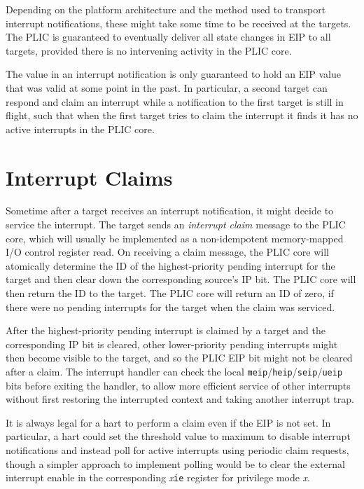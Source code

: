 Depending on the platform architecture and the method used to
transport interrupt notifications, these might take some time to be
received at the targets.  The PLIC is guaranteed to eventually deliver
all state changes in EIP to all targets, provided there is no
intervening activity in the PLIC core.

\begin{commentary}
The value in an interrupt notification is only guaranteed to hold an
EIP value that was valid at some point in the past.  In particular, a
second target can respond and claim an interrupt while a notification
to the first target is still in flight, such that when the first
target tries to claim the interrupt it finds it has no active
interrupts in the PLIC core.
\end{commentary}

\section{Interrupt Claims}

Sometime after a target receives an interrupt notification, it might
decide to service the interrupt.  The target sends an {\em interrupt
  claim} message to the PLIC core, which will usually be implemented
as a non-idempotent memory-mapped I/O control register read.  On
receiving a claim message, the PLIC core will atomically determine the
ID of the highest-priority pending interrupt for the target and then
clear down the corresponding source's IP bit.  The PLIC core will then
return the ID to the target.  The PLIC core will return an ID of zero,
if there were no pending interrupts for the target when the claim was
serviced.

After the highest-priority pending interrupt is claimed by a target
and the corresponding IP bit is cleared, other lower-priority pending
interrupts might then become visible to the target, and so the PLIC
EIP bit might not be cleared after a claim.  The interrupt handler
can check the local {\tt meip}/{\tt heip}/{\tt seip}/{\tt ueip} bits
before exiting the handler, to allow more efficient service of other
interrupts without first restoring the interrupted context and taking
another interrupt trap.

It is always legal for a hart to perform a claim even if the EIP is
not set.  In particular, a hart could set the threshold value to maximum
to disable interrupt notifications and instead poll for active
interrupts using periodic claim requests, though a simpler approach to
implement polling would be to clear the external interrupt enable in
the corresponding {\em x}{\tt ie} register for privilege mode {\em x}.


